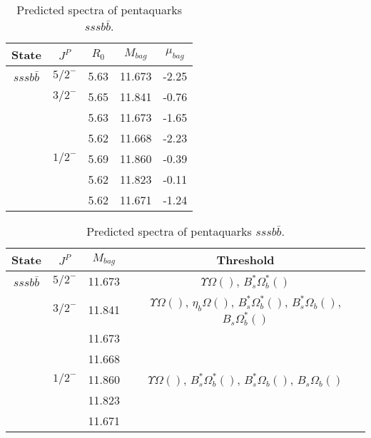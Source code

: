 \documentclass[prd,twocolumn,floatfix,nofootinbib]{revtex4}
\begin{document}
\renewcommand{\tabcolsep}{0.5cm}
\renewcommand{\arraystretch}{1.2}
\begin{table*}[!htbp]
    \caption{Predicted spectra of pentaquarks $sssb\bar{b}$.}
    \begin{tabular}{ccccc}
        \hline\hline
        {\rm State} &$J^{P}$ &$R_{0}$ &$M_{bag}$ &$\mu_{bag}$ \\ \hline
        $sssb\bar{b}$
            &${5/2}^{-}$    &5.63   &11.673 &-2.25 \\
            &${3/2}^{-}$    &5.65   &11.841 &-0.76  \\
            &               &5.63   &11.673 &-1.65 \\
            &               &5.62   &11.668 &-2.23  \\
            &${1/2}^{-}$    &5.69   &11.860 &-0.39  \\
            &               &5.62   &11.823 &-0.11  \\
            &               &5.62   &11.671 &-1.24 \\
        \hline\hline
    \end{tabular}
\end{table*}

\renewcommand{\tabcolsep}{0.5cm}
\renewcommand{\arraystretch}{1.2}
\begin{table*}[!htbp]
    \caption{Predicted spectra of pentaquarks $sssb\bar{b}$.}
    \begin{tabular}{cccc}
        \hline\hline
        {\rm State} &$J^{P}$ &$M_{bag}$ &Threshold \\ \hline
        $sssb\bar{b}$
            &${5/2}^{-}$    &11.673 &$\Upsilon\Omega()$, $B_{s}^{\ast}\Omega_{b}^{\ast}()$ \\
            &${3/2}^{-}$    &11.841 &$\Upsilon\Omega()$, $\eta_{b}\Omega()$, $B_{s}^{\ast}\Omega_{b}^{\ast}()$, $B_{s}^{\ast}\Omega_{b}()$, $B_{s}\Omega_{b}^{\ast}()$ \\
            &               &11.673 & \\
            &               &11.668 & \\
            &${1/2}^{-}$    &11.860 &$\Upsilon\Omega()$, $B_{s}^{\ast}\Omega_{b}^{\ast}()$, $B_{s}^{\ast}\Omega_{b}()$, $B_{s}\Omega_{b}()$ \\
            &               &11.823 & \\
            &               &11.671 & \\
        \hline\hline
    \end{tabular}
\end{table*}
\end{document}
